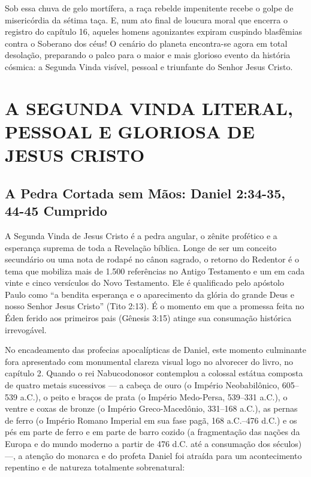 \documentclass[11pt,a4paper,openany]{book}
\begin{document}
Sob essa chuva de gelo mortífera, a raça rebelde impenitente recebe o golpe de misericórdia da sétima taça. E, num ato final de loucura moral que encerra o registro do capítulo 16, aqueles homens agonizantes expiram cuspindo blasfêmias contra o Soberano dos céus! O cenário do planeta encontra-se agora em total desolação, preparando o palco para o maior e mais glorioso evento da história cósmica: a Segunda Vinda visível, pessoal e triunfante do Senhor Jesus Cristo.



\section{A SEGUNDA VINDA LITERAL, PESSOAL E GLORIOSA DE JESUS CRISTO}



\subsection{A Pedra Cortada sem Mãos: Daniel 2:34-35, 44-45 Cumprido}


A Segunda Vinda de Jesus Cristo é a pedra angular, o zênite profético e a esperança suprema de toda a Revelação bíblica. Longe de ser um conceito secundário ou uma nota de rodapé no cânon sagrado, o retorno do Redentor é o tema que mobiliza mais de 1.500 referências no Antigo Testamento e um em cada vinte e cinco versículos do Novo Testamento. Ele é qualificado pelo apóstolo Paulo como ``a bendita esperança e o aparecimento da glória do grande Deus e nosso Senhor Jesus Cristo'' (Tito 2:13). É o momento em que a promessa feita no Éden ferido aos primeiros pais (Gênesis 3:15) atinge sua consumação histórica irrevogável.

No encadeamento das profecias apocalípticas de Daniel, este momento culminante fora apresentado com monumental clareza visual logo no alvorecer do livro, no capítulo 2. Quando o rei Nabucodonosor contemplou a colossal estátua composta de quatro metais sucessivos — a cabeça de ouro (o Império Neobabilônico, 605–539 a.C.), o peito e braços de prata (o Império Medo-Persa, 539–331 a.C.), o ventre e coxas de bronze (o Império Greco-Macedônio, 331–168 a.C.), as pernas de ferro (o Império Romano Imperial em sua fase pagã, 168 a.C.–476 d.C.) e os pés em parte de ferro e em parte de barro cozido (a fragmentação das nações da Europa e do mundo moderno a partir de 476 d.C. até a consumação dos séculos) —, a atenção do monarca e do profeta Daniel foi atraída para um acontecimento repentino e de natureza totalmente sobrenatural:
\end{document}
